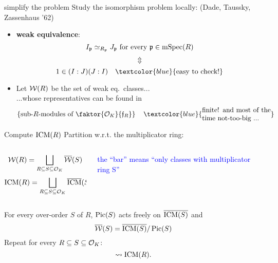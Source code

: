 \documentclass{beamer}
\begin{document}
\begin{frame}{ simplify the problem  }
Study the isomorphism problem locally: (Dade, Taussky, Zassenhaus '62)
\begin{itemize}
\pause \item  \textbf{weak equivalence}:
\[I_{\mathfrak p}\simeq_{R_{\mathfrak p}} J_{\mathfrak p} \text{ for every }{\mathfrak p}\in \operatorname{mSpec}(R)\]
\pause \vspace{-6mm}\[\Updownarrow\]
\[1\in (I:J)(J:I)\quad \textcolor{blue}{\text{easy to check!}}\]
\pause \item Let ${\mathcal W}(R)$ be the set of weak eq.~classes...\\
\pause ...whose representatives can be found in
	\[\set{\text{sub-$R$-modules of $\faktor{\cO_K}{\frf_R}$}}\quad \textcolor{blue}{\parbox{10 em}{finite! and most of the time not-too-big ...}}\]
\end{itemize}
\end{frame}

\begin{frame}{ Compute $\operatorname{ICM}(R)$ }
\pause Partition w.r.t. the multiplicator ring:
    \begin{columns}
    \begin{column}{0.5\textwidth}
      \[ {\mathcal W}(R) = \bigsqcup_{R\subseteq S \subseteq {\mathcal O}_K} \overline {{\mathcal W}}(S)\]
      \[\operatorname{ICM}(R) = \bigsqcup_{R\subseteq S \subseteq {\mathcal O}_K} \overline {\operatorname{ICM}}(S)\]
    \end{column}
\pause
    \begin{column}{0.5\textwidth}  %
	\begin{center}
	\textcolor{blue}{\parbox{10em}{the ``bar'' means ``only classes with multiplicator ring S''}} 
	\end{center}
    \end{column}
    \end{columns}
\pause
   \begin{theorem}[M.]
    For every over-order $S$ of $R$, $\operatorname{Pic}(S)$ acts freely on $\overline{\operatorname{ICM}(S)}$ and
    \[ \overline{{\mathcal W}}(S) = \overline{\operatorname{ICM}(S)}/\operatorname{Pic}(S) \]
\pause Repeat for every $R\subseteq S \subseteq {\mathcal O}_K$:
    \[ \rightsquigarrow \operatorname{ICM}(R).\]
   \end{theorem}
\end{frame}
\end{document}
